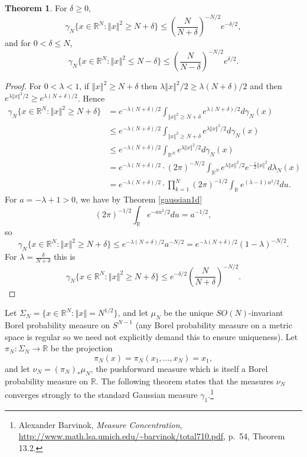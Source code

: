 \documentclass{article}
\newcommand{\norm}[1]{\left\Vert #1 \right\Vert}
\theoremstyle{definition}
\newtheorem{theorem}{Theorem}
\theoremstyle{definition}
\begin{document}
\begin{theorem}
For $\delta \geq 0$,
\[
\gamma_N\{x \in \mathbb{R}^N: \norm{x}^2 \geq N+\delta \} \leq \left( \frac{N}{N+\delta} \right)^{-N/2} e^{-\delta/2},
\]
and for $0<\delta \leq N$,
\[
\gamma_N\{x \in \mathbb{R}^N: \norm{x}^2 \leq N-\delta\} \leq \left(\frac{N}{N-\delta} \right)^{-N/2} e^{\delta/2}.
\]
\end{theorem}
\begin{proof}
For $0<\lambda<1$, if $\norm{x}^2 \geq N+\delta$ then $\lambda \norm{x}^2/2 \geq \lambda(N+\delta)/2$
and then $e^{\lambda \norm{x}^2/2} \geq e^{\lambda(N+\delta)/2}$.
Hence
\begin{align*}
\gamma_N\{x \in \mathbb{R}^N: \norm{x}^2 \geq N+\delta\}&=e^{-\lambda(N+\delta)/2} \int_{\norm{x}^2 \geq N+\delta} e^{\lambda(N+\delta)/2} d\gamma_N(x)\\
&\leq e^{-\lambda(N+\delta)/2} \int_{\norm{x}^2 \geq N+\delta} e^{\lambda \norm{x}^2/2} d\gamma_N(x)\\
&\leq e^{-\lambda(N+\delta)/2} \int_{\mathbb{R}^N} e^{\lambda \norm{x}^2/2} d\gamma_N(x)\\
&=  e^{-\lambda(N+\delta)/2} 
\cdot  (2\pi)^{-N/2}
\int_{\mathbb{R}^N} e^{\lambda \norm{x}^2/2}    e^{-\frac{1}{2}\norm{x}^2} d\lambda_N(x)\\
&=  e^{-\lambda(N+\delta)/2}  \cdot \prod_{k=1}^N (2\pi)^{-1/2} \int_{\mathbb{R}} e^{(\lambda-1) u^2/2} du.
\end{align*}
For $a=-\lambda+1>0$, we have by Theorem \ref{gaussian1d}
\[
(2\pi)^{-1/2} \int_{\mathbb{R}}  e^{-au^2/2} du = a^{-1/2},
\]
so
\[
\gamma_N\{x \in \mathbb{R}^N: \norm{x}^2 \geq N+\delta\} \leq
e^{-\lambda(N+\delta)/2}  a^{-N/2} = e^{-\lambda(N+\delta)/2}   (1-\lambda)^{-N/2}.
\]
For $\lambda=\frac{\delta}{N+\delta}$ this is
\[
\gamma_N\{x \in \mathbb{R}^N: \norm{x}^2 \geq N+\delta\} \leq e^{-\delta/2} \left( \frac{N}{N+\delta} \right)^{-N/2}.
\]
\end{proof}


Let $\Sigma_N=\{x \in \mathbb{R}^N: \norm{x} = N^{1/2}\}$, and let $\mu_N$ be the unique
$SO(N)$-invariant  Borel probability measure on $S^{N-1}$ (any Borel probability measure on a metric space is regular so we need not explicitly demand this to ensure uniqueness).
Let $\pi_N:\Sigma_N \to \mathbb{R}$ be the projection 
\[
\pi_N(x) = \pi_N(x_1,\ldots,x_N) = x_1,
\]
and let $\nu_N=(\pi_N)_* \mu_N$, the pushforward measure which is itself a Borel probability measure on $\mathbb{R}$. 
The following theorem states that the measures $\nu_N$ converges strongly to the standard Gaussian measure $\gamma_1$.\footnote{Alexander
Barvinok, {\em Measure Concentration}, \url{http://www.math.lsa.umich.edu/~barvinok/total710.pdf},
p.~54, Theorem 13.2.}
\end{document}

